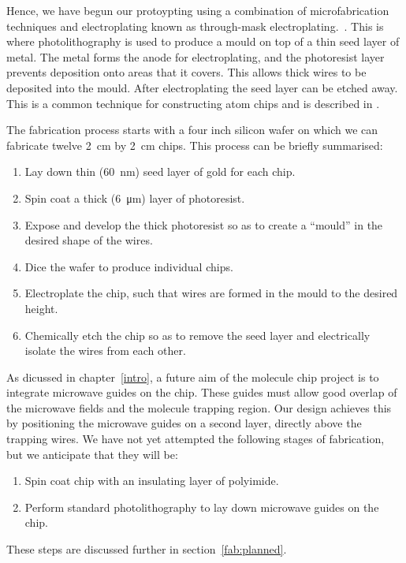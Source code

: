 Hence, we have begun our protoypting using a combination of microfabrication
techniques and electroplating known as through-mask
electroplating.~\cite{Ruythooren_2000}. This is where photolithography is used
to produce a mould on top of a thin seed layer of metal. The metal forms the
anode for electroplating, and the photoresist layer prevents deposition onto
areas that it covers. This allows thick wires to be deposited into the mould.
After electroplating the seed layer can be etched away.  This is a common
technique for constructing atom chips and is described in .

The fabrication process starts with a four inch silicon wafer on which we can
fabricate twelve \SI{2}{\centi\meter} by \SI{2}{\centi\meter}  chips. This
process can be briefly summarised:
\begin{enumerate}
\item Lay down thin (\SI{60}{\nano\meter}) seed layer of gold for each chip.
\item Spin coat a thick (\SI{6}{\micro\meter}) layer of photoresist.
\item Expose and develop the thick photoresist so as to create a ``mould''
in the desired shape of the wires.
\item Dice the wafer to produce individual chips.
\item Electroplate the chip, such that wires are formed in the mould to the
desired height.
\item Chemically etch the chip so as to remove the seed layer and
  electrically isolate the wires from each other.
\end{enumerate}
%


As dicussed in chapter~\ref{intro}, a future aim of the molecule chip project is to
integrate microwave guides on the chip. These guides must allow good overlap of
the microwave fields and the molecule trapping region. Our design achieves this
by positioning the microwave guides on a second layer, directly above the
trapping wires. We have not yet attempted the following stages of
fabrication, but we anticipate that they will be:
\begin{enumerate}[resume]
    \item Spin coat chip with an insulating layer of polyimide.
    \item Perform standard photolithography to lay down microwave guides on the
      chip.
\end{enumerate}
These steps are discussed further in section~\ref{fab:planned}.

